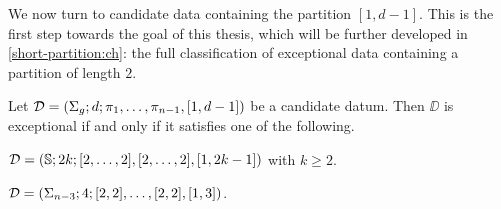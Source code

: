 We now turn to candidate data containing the partition $[1,d-1]$. This is the first step towards the goal of this thesis, which will be further developed in \cref{short-partition:ch}: the full classification of exceptional data containing a partition of length $2$.

\begin{proposition}\label{monodromy:th:sphere-[1 d-1]}
Let $\mathcal{D}=(\Sigma_{g};d;\pi_1,\ldots,\pi_{n-1},[1,d-1])$ be a candidate datum. Then $\DD$ is exceptional if and only if it satisfies one of the following.
\begin{enumarabic}
\item $\mathcal{D}=(\mathbb{S}{};2k;[2,\ldots,2],[2,\ldots,2],[1,2k-1])$ with $k\ge 2$.
\item $\mathcal{D}=(\Sigma_{n-3};4;[2,2],\ldots,[2,2],[1,3])$.
\end{enumarabic}
\end{proposition}
